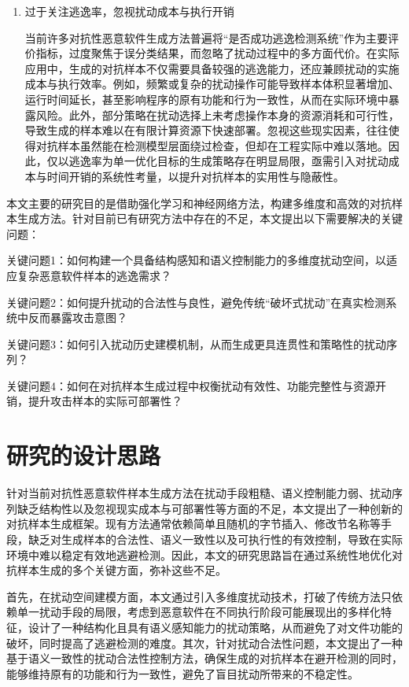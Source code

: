 \begin{enumerate} [label=\arabic*)]
\item 过于关注逃逸率，忽视扰动成本与执行开销

当前许多对抗性恶意软件生成方法普遍将“是否成功逃逸检测系统”作为主要评价指标，过度聚焦于误分类结果，而忽略了扰动过程中的多方面代价。在实际应用中，生成的对抗样本不仅需要具备较强的逃逸能力，还应兼顾扰动的实施成本与执行效率。例如，频繁或复杂的扰动操作可能导致样本体积显著增加、运行时间延长，甚至影响程序的原有功能和行为一致性，从而在实际环境中暴露风险。此外，部分策略在扰动选择上未考虑操作本身的资源消耗和可行性，导致生成的样本难以在有限计算资源下快速部署。忽视这些现实因素，往往使得对抗样本虽然能在检测模型层面绕过检查，但却在工程实际中难以落地。因此，仅以逃逸率为单一优化目标的生成策略存在明显局限，亟需引入对扰动成本与时间开销的系统性考量，以提升对抗样本的实用性与隐蔽性。

\end{enumerate}

本文主要的研究目的是借助强化学习和神经网络方法，构建多维度和高效的对抗样本生成方法。针对目前已有研究方法中存在的不足，本文提出以下需要解决的关键问题：

关键问题1：如何构建一个具备结构感知和语义控制能力的多维度扰动空间，以适应复杂恶意软件样本的逃逸需求？

关键问题2：如何提升扰动的合法性与良性，避免传统“破坏式扰动”在真实检测系统中反而暴露攻击意图？

关键问题3：如何引入扰动历史建模机制，从而生成更具连贯性和策略性的扰动序列？

关键问题4：如何在对抗样本生成过程中权衡扰动有效性、功能完整性与资源开销，提升攻击样本的实际可部署性？

\section{研究的设计思路}
针对当前对抗性恶意软件样本生成方法在扰动手段粗糙、语义控制能力弱、扰动序列缺乏结构性以及忽视现实成本与可部署性等方面的不足，本文提出了一种创新的对抗样本生成框架。现有方法通常依赖简单且随机的字节插入、修改节名称等手段，缺乏对生成样本的合法性、语义一致性以及可执行性的有效控制，导致在实际环境中难以稳定有效地逃避检测。因此，本文的研究思路旨在通过系统性地优化对抗样本生成的多个关键方面，弥补这些不足。

首先，在扰动空间建模方面，本文通过引入多维度扰动技术，打破了传统方法只依赖单一扰动手段的局限，考虑到恶意软件在不同执行阶段可能展现出的多样化特征，设计了一种结构化且具有语义感知能力的扰动策略，从而避免了对文件功能的破坏，同时提高了逃避检测的难度。其次，针对扰动合法性问题，本文提出了一种基于语义一致性的扰动合法性控制方法，确保生成的对抗样本在避开检测的同时，能够维持原有的功能和行为一致性，避免了盲目扰动所带来的不稳定性。

